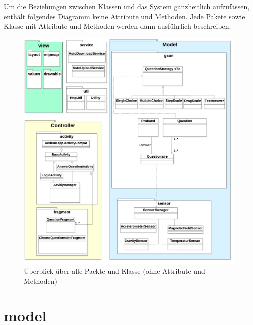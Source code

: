 \documentclass[a4paper]{scrreprt}
\begin{document}
            \noindent Um die Beziehungen zwischen Klassen und das System ganzheitlich aufzufassen, enthält folgendes Diagramm keine Attribute und Methoden. Jede Pakete sowie Klasse mit Attribute und Methoden werden dann ausführlich beschreiben.



            \newpage
            \vspace*{1cm}
            \begin{figure}[H]
                \centering
                \includegraphics[scale = 0.25]{packageDiagram.jpg}
                \caption{Überblick über alle Packte und Klasse (ohne Attribute und Methoden)}
            \end{figure}





        \section{model}
\end{document}
